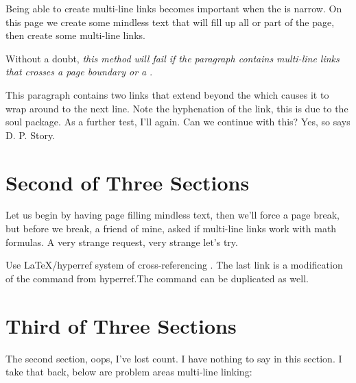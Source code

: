 \documentclass{article}
\begin{document}
\parskip0pt

\begin{multicols}{2}
\noindent Being able to create multi-line links becomes important when the
\texttt{\string\linewidth} is narrow. On this page we create some
mindless text that will fill up all or part of the page, then create
some multi-line links.

Without a doubt, \textsl{this method will fail if the paragraph contains
multi-line links that crosses a \emph{page boundary} or a \emph{}}.

This paragraph contains two links that extend beyond the
 which causes it to wrap around to the next line. Note the
hyphenation of the link, this is due to the \textsf{soul} package.
As a further test, I'll  again. Can we continue with
this? Yes, so says D. P. Story.

\end{multicols}


\section{Second of Three Sections}\label{second}

Let us begin by having page filling mindless text,
then we'll force a page break, but before we break, a friend of
mine, asked if multi-line links work with math formulas. A very strange request,
 very strange
let's try.

Use \LaTeX/hyperref system of cross-referencing
. The last link is a modification of
the \texttt{\string\nameref} command from hyperref.The
\texttt{\string\Nameref} command can be duplicated
 as well.

\newpage

\section{Third of Three Sections}\label{three}

The second section, oops, I've lost count. I have nothing to say in
this section. I take that back, below are problem areas multi-line
linking:
\end{document}
